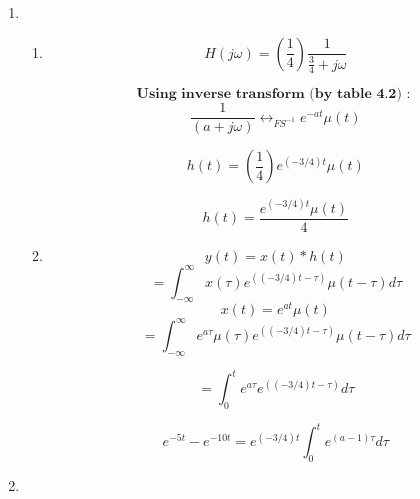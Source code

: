 \documentclass[10pt,a4paper, margin=1in]{article}
\begin{document}
\begin{enumerate}
\begin{enumerate}
    \end{enumerate} 
    
\item %
    \begin{enumerate}
    \item %
    \[ H(j\omega) = (\frac{1}{4}) \frac{1}{\frac{3}{4}+j\omega }\]

    \[ \textbf{Using inverse transform (by table 4.2) : }\]
    \[ \frac{1}{(a+j\omega)}  \longleftrightarrow_{FS^{-1}} e^{-at} \mu(t) \]
    
    \[ h(t) = (\frac{1}{4}) e^{ (-3/4) t} \mu(t) \]

    \[ h(t) = \frac{e^{ (-3/4) t} \mu(t)}{4} \]
    
    \item %

    \[ y(t) = x(t) \ast h(t) \]
    \[ =\int_{-\infty}^{\infty} x(\tau) e^{( (-3/4)t - \tau )} \mu(t - \tau) d\tau\]
    \[ x(t) = e^{at} \mu(t) \]
    \[ =\int_{-\infty}^{\infty} e^{a\tau} \mu(\tau) e^{( (-3/4)t - \tau )} \mu(t - \tau) d\tau\]
            
    \[ =\int_{0}^{t} e^{a\tau} e^{( (-3/4)t - \tau )} d\tau\]

    \[ e^{-5t} - e^{-10t} = e^{(-3/4)t} \int_{0}^{t} e^{(a-1)\tau} d\tau\]
    
    
    \end{enumerate}
    
\item %

\end{enumerate}
\end{document}
